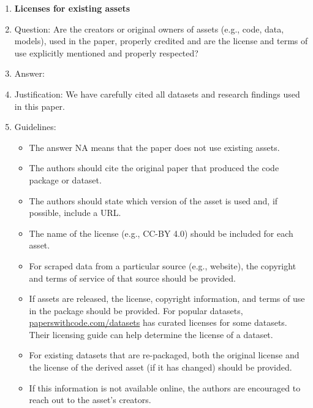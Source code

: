 \documentclass{article}
\begin{document}
\begin{enumerate}
\item {\bf Licenses for existing assets}
    \item[] Question: Are the creators or original owners of assets (e.g., code, data, models), used in the paper, properly credited and are the license and terms of use explicitly mentioned and properly respected?
    \item[] Answer: \answerYes{} %
    \item[] Justification: We have carefully cited all datasets and research findings used in this paper.
    \item[] Guidelines:
    \begin{itemize}
        \item The answer NA means that the paper does not use existing assets.
        \item The authors should cite the original paper that produced the code package or dataset.
        \item The authors should state which version of the asset is used and, if possible, include a URL.
        \item The name of the license (e.g., CC-BY 4.0) should be included for each asset.
        \item For scraped data from a particular source (e.g., website), the copyright and terms of service of that source should be provided.
        \item If assets are released, the license, copyright information, and terms of use in the package should be provided. For popular datasets, \url{paperswithcode.com/datasets} has curated licenses for some datasets. Their licensing guide can help determine the license of a dataset.
        \item For existing datasets that are re-packaged, both the original license and the license of the derived asset (if it has changed) should be provided.
        \item If this information is not available online, the authors are encouraged to reach out to the asset's creators.
    \end{itemize}


\end{enumerate}
\end{document}
